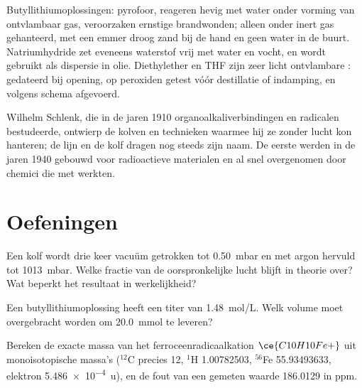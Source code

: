 \begin{safety}{}
Butyllithiumoplossingen: pyrofoor, reageren hevig met water onder vorming
van ontvlambaar gas, veroorzaken ernstige brandwonden; alleen onder inert
gas gehanteerd, met een emmer droog zand bij de hand en geen water in de
buurt. Natriumhydride zet eveneens waterstof vrij met water en vocht, en
wordt gebruikt als dispersie in olie. Diethylether en THF zijn zeer
licht ontvlambare : gedateerd bij opening, op peroxiden
getest vóór destillatie of indamping, en volgens schema afgevoerd.
\end{safety}

\begin{history}
Wilhelm Schlenk, die in de jaren 1910 organoalkaliverbindingen en
radicalen bestudeerde, ontwierp de kolven en technieken waarmee hij ze
zonder lucht kon hanteren; de lijn en de kolf dragen nog steeds zijn
naam. De eerste  werden in de jaren 1940 gebouwd voor
radioactieve materialen en al snel overgenomen door chemici die met
 werkten.
\end{history}

\section{Oefeningen}

\begin{exercise}[$\star$]\label{exo:b3:lab-techniques-3:1}
Een kolf wordt drie keer vacuüm getrokken tot \qty{0.50}{mbar} en met argon hervuld tot \qty{1013}{mbar}. Welke fractie van
de oorspronkelijke lucht blijft in theorie over? Wat beperkt het
resultaat in werkelijkheid?
\end{exercise}

\begin{exercise}[$\star$]\label{exo:b3:lab-techniques-3:2}
Een butyllithiumoplossing heeft een titer van \qty{1.48}{mol/L}. Welk volume moet overgebracht worden om
\qty{20.0}{mmol} te leveren?
\end{exercise}

\begin{exercise}[$\star$]\label{exo:b3:lab-techniques-3:3}
Bereken de exacte massa van het ferroceenradicaalkation $\ce{C10H10Fe+}$ uit monoisotopische massa's
($^{12}$C precies 12, $^1$H 1.00782503, $^{56}$Fe 55.93493633, elektron \qty{5.486e-4}{u}), en de fout van een gemeten
waarde 186.0129 in ppm.
\end{exercise}

